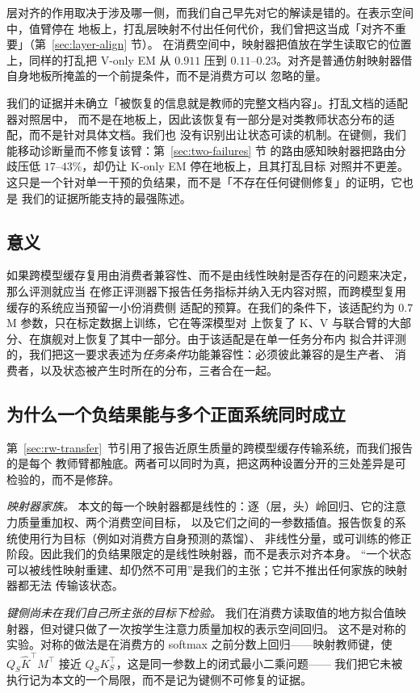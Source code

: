 \documentclass[11pt]{article}
\begin{document}
层对齐的作用取决于涉及哪一侧，而我们自己早先对它的解读是错的。在表示空间中，值臂停在
地板上，打乱层映射不付出任何代价，我们曾把这当成「对齐不重要」（第~\ref{sec:layer-align} 节）。
在消费空间中，映射器把值放在学生读取它的位置上，同样的打乱把 V-only EM 从 $0.911$ 压到
$0.11$--$0.23$。对齐是普通仿射映射器借自身地板所掩盖的一个前提条件，而不是消费方可以
忽略的量。

我们的证据并未确立「被恢复的信息就是教师的完整文档内容」。打乱文档的适配器对照居中，
而不是在地板上，因此该恢复有一部分是对类教师状态分布的适配，而不是针对具体文档。我们也
没有识别出让状态可读的机制。在键侧，我们能移动诊断量而不修复该臂：第~\ref{sec:two-failures} 节
的路由感知映射器把路由分歧压低 $17$--$43\%$，却仍让 K-only EM 停在地板上，且其打乱目标
对照并不更差。这只是一个针对单一干预的负结果，而不是「不存在任何键侧修复」的证明，它也是
我们的证据所能支持的最强陈述。

\subsection{意义}
\label{sec:implications}
如果跨模型缓存复用由消费者兼容性、而不是由线性映射是否存在的问题来决定，那么评测就应当
在修正评测器下报告任务指标并纳入无内容对照，而跨模型复用缓存的系统应当预留一小份消费侧
适配的预算。在我们的条件下，该适配约为 $0.7$M 参数，只在标定数据上训练，它在等深模型对
上恢复了 K、V 与联合臂的大部分、在旗舰对上恢复了其中一部分。由于该适配是在单一任务分布内
拟合并评测的，我们把这一要求表述为\emph{任务条件}功能兼容性：必须彼此兼容的是生产者、
消费者，以及状态被产生时所在的分布，三者合在一起。

\subsection{为什么一个负结果能与多个正面系统同时成立}
\label{sec:discussion-reconcile}
第~\ref{sec:rw-transfer}~节引用了报告近原生质量的跨模型缓存传输系统，而我们报告的是每个
教师臂都触底。两者可以同时为真，把这两种设置分开的三处差异是可检验的，而不是修辞。

\emph{映射器家族。}
本文的每一个映射器都是线性的：逐（层，头）岭回归、它的注意力质量重加权、两个消费空间目标，
以及它们之间的一参数插值。报告恢复的系统使用行为目标（例如对消费方自身预测的蒸馏）、
非线性分量，或可训练的修正阶段。因此我们的负结果限定的是线性映射器，而不是表示对齐本身。
“一个状态可以被线性映射重建、却仍然不可用”是我们的主张；它并不推出任何家族的映射器都无法
传输该状态。

\emph{键侧尚未在我们自己所主张的目标下检验。}
我们在消费方读取值的地方拟合值映射器，但对键只做了一次按学生注意力质量加权的表示空间回归。
这不是对称的实验。对称的做法是在消费方的 softmax 之前分数上回归——映射教师键，使
$Q_S\hat K^{\top}M^{\top}$ 接近 $Q_SK_S^{\top}$，这是同一参数上的闭式最小二乘问题——
我们把它未被执行记为本文的一个局限，而不是记为键侧不可修复的证据。
\end{document}
